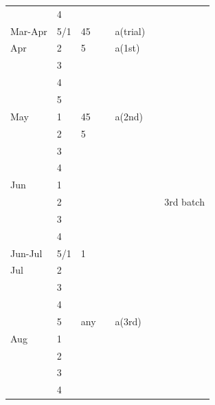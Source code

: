 \documentclass[a4paper, 11pt]{article}
\begin{document}
\begin{longtable}{p{.1\linewidth}p{.1\linewidth}|p{.1\linewidth}|p{.1\linewidth}|p{.1\linewidth}|p{.1\linewidth}|p{.1\linewidth}|}
	& 4 & \cellcolor{lorange} & \cellcolor{lorange} & \cellcolor{grey90} & \cellcolor{lorange} & \cellcolor{grey90} \\
	Mar-Apr & 5/1 & \cellcolor{grey90}45 && \cellcolor{grey90}a(trial) && \cellcolor{grey90} \\
	Apr & 2 & \cellcolor{grey90}5 && \cellcolor{grey90}a(1st) && \cellcolor{grey90} \\
	& 3 & \cellcolor{grey90} && \cellcolor{grey90} && \cellcolor{grey90} \\
	& 4 & \cellcolor{grey90} && \cellcolor{grey90} && \cellcolor{grey90} \\
	& 5 & \cellcolor{grey90} && \cellcolor{grey90} && \cellcolor{grey90} \\
	May & 1 & \cellcolor{grey90}45 && \cellcolor{grey90}a(2nd) && \cellcolor{grey90} \\
	& 2 & \cellcolor{grey90}5 && \cellcolor{grey90} && \cellcolor{lorange} \\
	& 3 & \cellcolor{grey90} && \cellcolor{grey90} && \cellcolor{lorange} \\
	& 4 & \cellcolor{grey90} && \cellcolor{grey90} && \cellcolor{lorange} \\
	Jun & 1 & \cellcolor{grey90} && \cellcolor{lorange} && \cellcolor{lorange} \\
	& 2 & \cellcolor{lorange} && \cellcolor{lorange} && \cellcolor{lorange}3rd batch \\
	& 3 & \cellcolor{lorange} &&&& \cellcolor{lorange} \\
	& 4 & \cellcolor{lorange} &&&& \cellcolor{lorange} \\
	Jun-Jul & 5/1 & \cellcolor{grey90}1 &&&& \cellcolor{lorange} \\
	Jul & 2 & \cellcolor{grey90} &&&& \cellcolor{lorange} \\
	& 3 & \cellcolor{grey90} &&&& \cellcolor{lorange} \\
	& 4 & \cellcolor{grey90} &&&& \cellcolor{lorange} \\
	& 5 & \cellcolor{lorange}any && \cellcolor{lorange}a(3rd) && \cellcolor{lorange} \\
	Aug & 1 & \cellcolor{lorange} && \cellcolor{lorange} && \cellcolor{lorange} \\
	& 2 & \cellcolor{lorange} && \cellcolor{lorange} && \cellcolor{lorange} \\
	& 3 & \cellcolor{lorange} &&&& \cellcolor{lorange} \\
	& 4 & \cellcolor{lorange} &&&&\\
\end{longtable}
\end{document}
